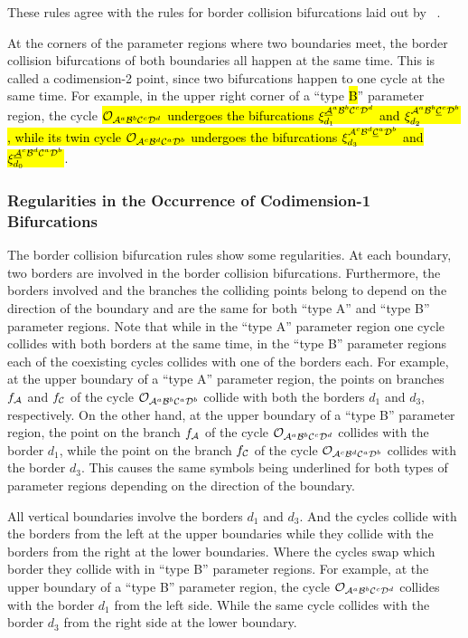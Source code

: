 These rules agree with the rules for border collision bifurcations laid out by ~\cite{akyuz2022}.

At the corners of the parameter regions where two boundaries meet, the border collision bifurcations of both boundaries all happen at the same time.
This is called a codimension-2 point, since two bifurcations happen to one cycle at the same time.
For example, in the upper right corner of a ``type \hl{B}'' parameter region, the cycle \hl{$\mathcal{O}_{\mathcal{A}^a\mathcal{B}^b\mathcal{C}^c\mathcal{D}^d}$ undergoes the bifurcations $\xi_{d_1}^{\underline{\mathcal{A}}^a\mathcal{B}^b\mathcal{C}^c\mathcal{D}^d}$ and $\xi_{d_2}^{\mathcal{A}^a\mathcal{B}^b\underline{\mathcal{C}}^c\mathcal{D}^b}$, while its twin cycle $\mathcal{O}_{\mathcal{A}^c\mathcal{B}^d\mathcal{C}^a\mathcal{D}^b}$ undergoes the bifurcations $\xi_{d_3}^{\mathcal{A}^c\mathcal{B}^d\underline{\mathcal{C}}^a\mathcal{D}^b}$ and $\xi_{d_0}^{\underline{\mathcal{A}}^c\mathcal{B}^d\mathcal{C}^a\mathcal{D}^b}$}.

\subsubsection{Regularities in the Occurrence of Codimension-1 Bifurcations}

The border collision bifurcation rules show some regularities.
At each boundary, two borders are involved in the border collision bifurcations.
Furthermore, the borders involved and the branches the colliding points belong to depend on the direction of the boundary and are the same for both ``type A'' and ``type B'' parameter regions.
Note that while in the ``type A'' parameter region one cycle collides with both borders at the same time, in the ``type B'' parameter regions each of the coexisting cycles collides with one of the borders each.
For example, at the upper boundary of a ``type A'' parameter region, the points on branches $f_{\mathcal{A}}$ and $f_{\mathcal{C}}$ of the cycle $\mathcal{O}_{\mathcal{A}^a\mathcal{B}^b\mathcal{C}^a\mathcal{D}^b}$ collide with both the borders $d_1$ and $d_3$, respectively.
On the other hand, at the upper boundary of a ``type B'' parameter region, the point on the branch $f_{\mathcal{A}}$ of the cycle $\mathcal{O}_{\mathcal{A}^a\mathcal{B}^b\mathcal{C}^c\mathcal{D}^d}$ collides with the border $d_1$, while the point on the branch $f_{\mathcal{C}}$ of the cycle $\mathcal{O}_{\mathcal{A}^c\mathcal{B}^d\mathcal{C}^a\mathcal{D}^b}$ collides with the border $d_3$.
This causes the same symbols being underlined for both types of parameter regions depending on the direction of the boundary.

All vertical boundaries involve the borders $d_1$ and $d_3$.
And the cycles collide with the borders from the left at the upper boundaries while they collide with the borders from the right at the lower boundaries.
Where the cycles swap which border they collide with in ``type B'' parameter regions.
For example, at the upper boundary of a ``type B'' parameter region, the cycle $\mathcal{O}_{\mathcal{A}^a\mathcal{B}^b\mathcal{C}^c\mathcal{D}^d}$ collides with the border $d_1$ from the left side.
While the same cycle collides with the border $d_3$ from the right side at the lower boundary.

